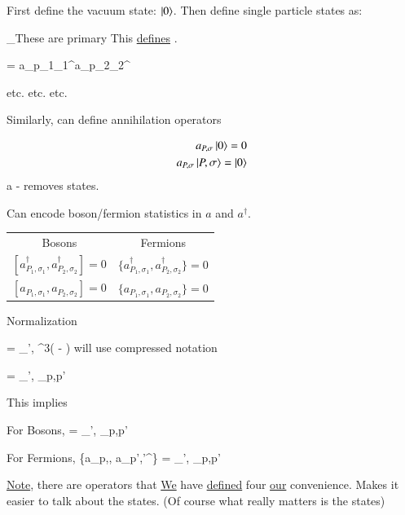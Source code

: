 {First define the vacuum state: $\ket{0}$.
Then define single particle states as:

\be
{}_{\textrm{These are primary}} \equiv \adagger {}
\ee
This \underline{defines} \adagger.



\be
{} = a_{p_1\sigma_1}^\dagger a_{p_2\sigma_2}^\dagger {}
\ee

etc. etc. etc.


Similarly,  can define annihilation operators


\begin{align*}
a_{P,\sigma} \ket{0} = 0\\
a_{P,\sigma} \ket{P,\sigma} = \ket{0}
\end{align*}
a - removes states. 


Can encode boson/fermion statistics in $a$ and $a^\dagger$.

\begin{center}
\begin{tabular}{c|c}
Bosons & Fermions \\
$[a_{P_1,\sigma_1}^\dagger, a_{P_2,\sigma_2}^\dagger] = 0 $  &  $\{a_{P_1,\sigma_1}^\dagger, a_{P_2,\sigma_2}^\dagger\} = 0 $\\  
$[a_{P_1,\sigma_1}, a_{P_2,\sigma_2}] = 0  $  &  $\{a_{P_1,\sigma_1}, a_{P_2,\sigma_2}\} = 0  $\\  
\end{tabular}
\end{center}


Normalization

\be
{} = \delta_{\sigma',\sigma} \delta^3( - )
\ee 
will use compressed notation

\be
{} = \delta_{\sigma',\sigma} \delta_{p,p'}
\ee 

This implies

For Bosons,
 = \delta_{\sigma',\sigma} \delta_{p,p'}
\ee


For Fermions,
\be
\{a_{p,\sigma}, a_{p',\sigma'}^\dagger\} = \delta_{\sigma',\sigma} \delta_{p,p'}
\ee

\underline{Note}, there are operators that \underline{We} have \underline{defined} four \underline{our} convenience.
Makes it easier to talk about the states.  (Of course what really matters is the states)

\clearpage

}

